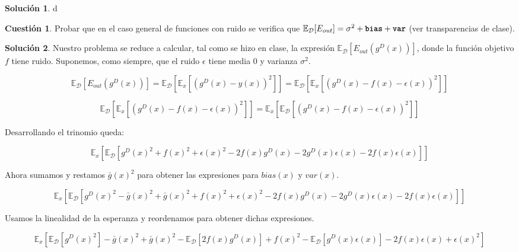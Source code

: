 \documentclass[a4paper, 11pt]{article}
\theoremstyle{definition}
\newtheorem{cuestion}{Cuestión}
\newtheorem*{solucion}{Solución}
\begin{document}
  \begin{solucion}
    d
  \end{solucion}

  \begin{cuestion}
    Probar que en el caso general de funciones con ruido se verifica que $\mathbb{E}_{\mathcal{D}}[E_{out}]= \sigma^2+\texttt{\textbf{bias}}+\texttt{\textbf{var}}$ (ver transparencias de clase).

  \end{cuestion}

  \begin{solucion}
    Nuestro problema se reduce a calcular, tal como se hizo en clase, la expresión $\mathbb{E}_{\mathcal{D}}[E_{out}(g^D(x))]$, donde la función objetivo $f$ tiene ruido. Suponemos, como siempre, que el ruido $\epsilon$ tiene media 0 y varianza $\sigma^2$.

    $$\mathbb{E}_{\mathcal{D}}\left[E_{out}\left(g^D(x)\right) \right] = \mathbb{E}_{\mathcal{D}} \left[\mathbb{E}_x \left[ \left(g^D(x) - y(x) \right)^ 2  \right] \right] = \mathbb{E}_{\mathcal{D}} \left[\mathbb{E}_x \left[ \left(g^D(x) - f(x) - \epsilon(x) \right)^ 2  \right] \right] $$

    $$ \mathbb{E}_{\mathcal{D}} \left[\mathbb{E}_x \left[ \left(g^D(x) - f(x) - \epsilon(x) \right)^ 2  \right] \right] = \mathbb{E}_x \left[\mathbb{E}_{\mathcal{D}} \left[ \left(g^D(x) - f(x) - \epsilon(x) \right)^ 2  \right] \right] $$

    Desarrollando el trinomio queda:

    $$ \mathbb{E}_x \left[\mathbb{E}_{\mathcal{D}} \left[ g^D(x)^2 + f(x)^2 + \epsilon(x)^2 - 2f(x)g^D(x) - 2g^D(x)\epsilon(x) - 2f(x)\epsilon(x) \right] \right]  $$

    Ahora sumamos y restamos $\bar{g}(x)^2$ para obtener las expresiones para $bias(x)$ y $var(x)$.

    $$ \mathbb{E}_x \left[\mathbb{E}_{\mathcal{D}} \left[ g^D(x)^2 - \bar{g}(x)^2 + \bar{g}(x)^2 + f(x)^2 + \epsilon(x)^2 - 2f(x)g^D(x) - 2g^D(x)\epsilon(x) - 2f(x)\epsilon(x) \right] \right] $$

    Usamos la linealidad de la esperanza y reordenamos para obtener dichas expresiones.

    $$ \mathbb{E}_x \left[\mathbb{E}_{\mathcal{D}} \left[ g^D(x)^2 \right] - \bar{g}(x)^2 + \bar{g}(x)^2 - \mathbb{E}_{\mathcal{D}}  \left[ 2f(x)g^D(x) \right] + f(x)^2 - \mathbb{E}_{\mathcal{D}} \left[ g^D(x)\epsilon(x) \right] - 2f(x)\epsilon(x) + \epsilon(x)^2 \right] $$

    


  \end{solucion}
\end{document}
